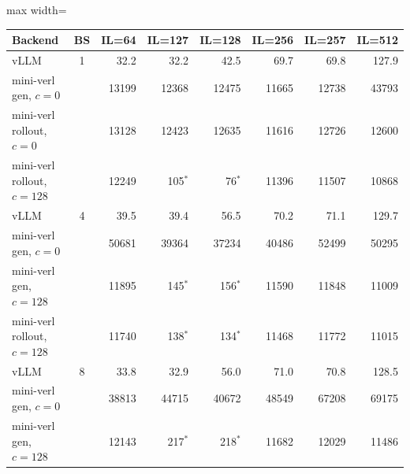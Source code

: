 %
\begin{table}[htbp]
    \centering
    \small
    \begin{adjustbox}{max width=\textwidth}
    \begin{tabular}{lcrrrrrr}
        \toprule
        \textbf{Backend} & \textbf{BS} &
        \textbf{IL=64} & \textbf{IL=127} & \textbf{IL=128} &
        \textbf{IL=256} & \textbf{IL=257} & \textbf{IL=512} \\
        \midrule
        vLLM                         & 1 & 32.2 & 32.2 & 42.5 & 69.7 & 69.8 & 127.9 \\
        mini-verl gen, $c{=}0$       &   & 13199 & 12368 & 12475 & 11665 & 12738 & 43793 \\
        mini-verl rollout, $c{=}0$   &   & 13128 & 12423 & 12635 & 11616 & 12726 & 12600 \\
        mini-verl rollout, $c{=}128$ &   & 12249 & 105$^*$ & 76$^*$ & 11396 & 11507 & 10868 \\
        \midrule
        vLLM                         & 4 & 39.5 & 39.4 & 56.5 & 70.2 & 71.1 & 129.7 \\
        mini-verl gen, $c{=}0$       &   & 50681 & 39364 & 37234 & 40486 & 52499 & 50295 \\
        mini-verl gen, $c{=}128$     &   & 11895 & 145$^*$ & 156$^*$ & 11590 & 11848 & 11009 \\
        mini-verl rollout, $c{=}128$ &   & 11740 & 138$^*$ & 134$^*$ & 11468 & 11772 & 11015 \\
        \midrule
        vLLM                         & 8 & 33.8 & 32.9 & 56.0 & 71.0 & 70.8 & 128.5 \\
        mini-verl gen, $c{=}0$       &   & 38813 & 44715 & 40672 & 48549 & 67208 & 69175 \\
        mini-verl gen, $c{=}128$     &   & 12143 & 217$^*$ & 218$^*$ & 11682 & 12029 & 11486 \\

\end{tabular}
\end{adjustbox}
\end{table}

